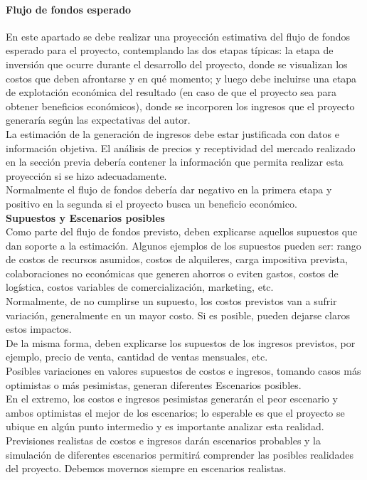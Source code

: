     \paragraph{Flujo de fondos esperado}
    {\consigna
    En este apartado se debe realizar una proyección estimativa del flujo de fondos esperado para el proyecto, contemplando las dos etapas típicas: la etapa de inversión que ocurre durante el desarrollo del proyecto, donde se visualizan los costos que deben afrontarse y en qué momento; y luego debe incluirse una etapa de explotación económica del resultado (en caso de que el proyecto sea para obtener beneficios económicos), donde se incorporen los ingresos que el proyecto generaría según las expectativas del autor.\\
    La estimación de la generación de ingresos debe estar justificada con datos e información objetiva. El análisis de precios y receptividad del mercado realizado en la sección previa debería contener la información que permita realizar esta proyección si se hizo adecuadamente.\\
    Normalmente el flujo de fondos debería dar negativo en la primera etapa y positivo en la segunda si el proyecto busca un beneficio económico.\\

    {\bf Supuestos y Escenarios posibles}\\
    Como parte del flujo de fondos previsto, deben explicarse aquellos supuestos que dan soporte a la estimación. Algunos ejemplos de los supuestos pueden ser: rango de costos de recursos asumidos, costos de alquileres, carga impositiva prevista, colaboraciones no económicas que generen ahorros o eviten gastos, costos de logística, costos variables de comercialización, marketing, etc.\\
    Normalmente, de no cumplirse un supuesto, los costos previstos van a sufrir variación, generalmente en un mayor costo. Si es posible, pueden dejarse claros estos impactos.\\
    De la misma forma, deben explicarse los supuestos de los ingresos previstos, por ejemplo, precio de venta, cantidad de ventas mensuales, etc.\\
    Posibles variaciones en valores supuestos de costos e ingresos, tomando casos más optimistas o más pesimistas, generan diferentes Escenarios posibles.\\
    En el extremo, los costos e ingresos pesimistas generarán el peor escenario y ambos optimistas el mejor de los escenarios; lo esperable es que el proyecto se ubique en algún punto intermedio y es importante analizar esta realidad.\\
    Previsiones realistas de costos e ingresos darán escenarios probables y la simulación de diferentes escenarios permitirá comprender las posibles realidades del proyecto. Debemos movernos siempre en escenarios realistas.
    }


